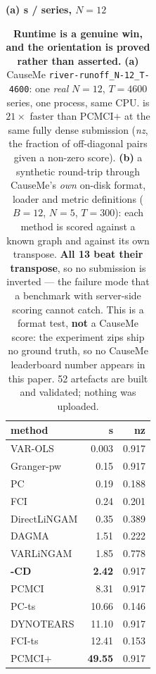 \begin{table}[t]\centering\scriptsize
\setlength{\tabcolsep}{2.6pt}
\caption{\textbf{Runtime is a genuine win, and the orientation is proved rather than
asserted.} \textbf{(a)} CauseMe \texttt{river-runoff\_N-12\_T-4600}: one \emph{real} $N{=}12$,
$T{=}4600$ series, one process, same CPU. \cd{} is $21\times$ faster than
PCMCI$+$ at the same fully dense submission (\emph{nz}, the fraction of off-diagonal
pairs given a non-zero score). \textbf{(b)} a synthetic round-trip through CauseMe's
\emph{own} on-disk format, loader and metric definitions ($B{=}12$, $N{=}5$,
$T{=}300$): each method is scored against a known graph and against its own
transpose. \textbf{All 13 beat their transpose}, so no submission is inverted ---
the failure mode that a benchmark with server-side scoring cannot catch. This is a
format test, \textbf{not} a CauseMe score: the experiment zips ship no ground truth, so
no CauseMe leaderboard number appears in this paper. 52 artefacts are built and
validated; nothing was uploaded.}
\label{tab:runtime}
\begin{minipage}[t]{0.44\columnwidth}
{\raggedright\textbf{(a) s / series, $N{=}12$}\par}
\vspace{1pt}
\begin{tabular}{@{}lrr@{}}
\toprule
method & s & nz \\
\midrule
VAR-OLS & 0.003 & 0.917 \\
Granger-pw & 0.15 & 0.917 \\
PC & 0.19 & 0.188 \\
FCI & 0.24 & 0.201 \\
DirectLiNGAM & 0.35 & 0.389 \\
DAGMA & 1.51 & 0.222 \\
VARLiNGAM & 1.85 & 0.778 \\
\textbf{\cafe{}-CD} & \textbf{2.42} & 0.917 \\
PCMCI & 8.31 & 0.917 \\
PC-ts & 10.66 & 0.146 \\
DYNOTEARS & 11.10 & 0.917 \\
FCI-ts & 12.41 & 0.153 \\
PCMCI$+$ & \textbf{49.55} & 0.917 \\
\bottomrule
\end{tabular}
\end{minipage}\hfill
\begin{minipage}[t]{0.54\columnwidth}

\end{minipage}
\end{table}
